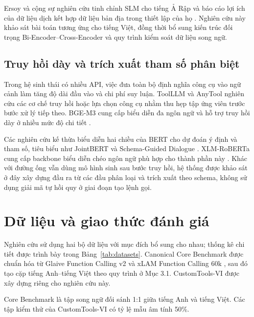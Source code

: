 \documentclass[10pt,twocolumn,a4paper]{article}
\begin{document}
Ersoy và cộng sự nghiên cứu tinh chỉnh SLM cho tiếng Ả Rập và báo cáo lợi ích của dữ liệu dịch kết hợp dữ liệu bản địa trong thiết lập của họ \cite{ersoy2025tool}. Nghiên cứu này khảo sát bài toán tương ứng cho tiếng Việt, đồng thời bổ sung kiến trúc đối trọng Bi-Encoder--Cross-Encoder và quy trình kiểm soát dữ liệu song ngữ.

\subsection{Truy hồi dày và trích xuất tham số phân biệt}
Trong hệ sinh thái có nhiều API, việc đưa toàn bộ định nghĩa công cụ vào ngữ cảnh làm tăng độ dài đầu vào và chi phí suy luận. ToolLLM \cite{qin2024toolllm} và AnyTool \cite{du2024anytool} nghiên cứu các cơ chế truy hồi hoặc lựa chọn công cụ nhằm thu hẹp tập ứng viên trước bước xử lý tiếp theo. BGE-M3 cung cấp biểu diễn đa ngôn ngữ và hỗ trợ truy hồi dày ở nhiều mức độ chi tiết \cite{chen2024bgem3}.

Các nghiên cứu kế thừa biểu diễn hai chiều của BERT \cite{devlin2019bert} cho dự đoán ý định và tham số, tiêu biểu như JointBERT \cite{chen2019jointbert} và Schema-Guided Dialogue \cite{rastogi2020schema}. XLM-RoBERTa cung cấp backbone biểu diễn chéo ngôn ngữ phù hợp cho thành phần này \cite{conneau2020xlmr}. Khác với đường ống vẫn dùng mô hình sinh sau bước truy hồi, hệ thống được khảo sát ở đây xây dựng đầu ra từ các đầu phân loại và trích xuất theo schema, không sử dụng giải mã tự hồi quy ở giai đoạn tạo lệnh gọi.


\section{Dữ liệu và giao thức đánh giá}

Nghiên cứu sử dụng hai bộ dữ liệu với mục đích bổ sung cho nhau; thống kê chi tiết được trình bày trong Bảng~\ref{tab:datasets}. Canonical Core Benchmark được chuẩn hóa từ Glaive Function Calling v2 \cite{glaive2023dataset} và xLAM Function Calling 60k \cite{xlam2024dataset}, sau đó tạo cặp tiếng Anh--tiếng Việt theo quy trình ở Mục 3.1. CustomTools-VI được xây dựng riêng cho nghiên cứu này.

Core Benchmark là tập song ngữ đối sánh 1:1 giữa tiếng Anh và tiếng Việt. Các tập kiểm thử của CustomTools-VI có tỷ lệ mẫu âm tính 50\%.
\end{document}
